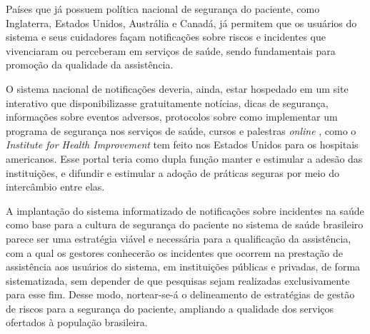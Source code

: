 \documentclass{article}
\begin{document}
Países que já possuem política nacional de segurança do paciente, como Inglaterra, Estados
        Unidos, Austrália e Canadá, já permitem que os usuários do sistema e seus cuidadores façam
        notificações sobre riscos e incidentes que vivenciaram ou perceberam em serviços de saúde,
        sendo fundamentais para promoção da qualidade da assistência.

O sistema nacional de notificações deveria, ainda, estar hospedado em um site interativo
        que disponibilizasse gratuitamente notícias, dicas de segurança, informações sobre eventos
        adversos, protocolos sobre como implementar um programa de segurança nos serviços de saúde,
        cursos e palestras %
\textit{online}
 , como o %
\textit{Institute for Health
          Improvement}
 tem feito nos Estados Unidos para os hospitais americanos. Esse
        portal teria como dupla função manter e estimular a adesão das instituições, e difundir e
        estimular a adoção de práticas seguras por meio do intercâmbio entre elas.

A implantação do sistema informatizado de notificações sobre incidentes na saúde como base
        para a cultura de segurança do paciente no sistema de saúde brasileiro parece ser uma
        estratégia viável e necessária para a qualificação da assistência, com a qual os gestores
        conhecerão os incidentes que ocorrem na prestação de assistência aos usuários do sistema, em
        instituições públicas e privadas, de forma sistematizada, sem depender de que pesquisas
        sejam realizadas exclusivamente para esse fim. Desse modo, nortear-se-á o delineamento de
        estratégias de gestão de riscos para a segurança do paciente, ampliando a qualidade dos
        serviços ofertados à população brasileira.

\end{document}
